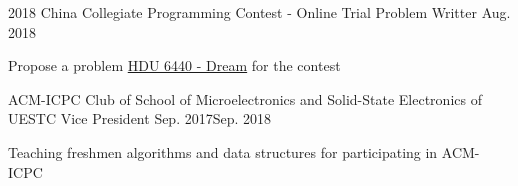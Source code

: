 
\begin{projitem}
    {2018 China Collegiate Programming Contest - Online Trial}
    {Problem Writter}
    {Aug. 2018}{}
    \item Propose a problem \href{http://acm.hdu.edu.cn/showproblem.php?pid=6440}{HDU 6440 - Dream}
    for the contest
\end{projitem}

\begin{projitem}
    {ACM-ICPC Club of School of Microelectronics and Solid-State Electronics of UESTC}
    {Vice President}
    {Sep. 2017}{Sep. 2018}
    \item Teaching freshmen algorithms and data structures for participating in ACM-ICPC
\end{projitem}

\endinput